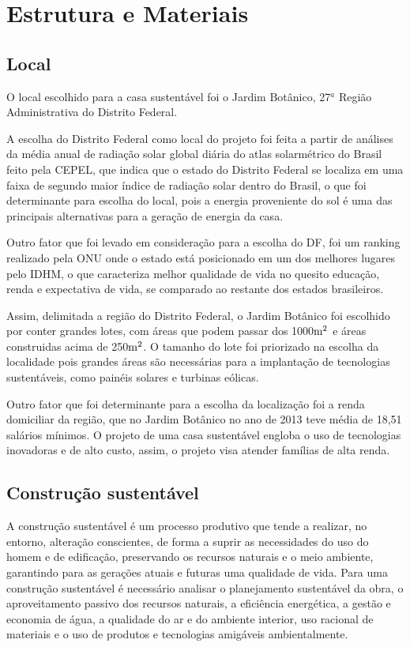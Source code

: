 \chapter{Estrutura e Materiais}

\section{Local}
	O local escolhido para a casa sustentável foi o Jardim Botânico, 27$^a$ Região Administrativa do Distrito Federal.

	A escolha do Distrito Federal como local do projeto foi feita a partir de análises da média anual de radiação solar global diária do atlas solarmétrico do Brasil feito pela CEPEL, que indica que o estado do Distrito Federal se localiza em uma faixa de segundo maior índice de radiação solar dentro do Brasil, o que foi determinante para escolha do local, pois a energia proveniente do sol é uma das principais alternativas para a geração de energia da casa.

	Outro fator que foi levado em consideração para a escolha do DF, foi um ranking realizado pela ONU onde o estado está posicionado em um dos melhores lugares pelo IDHM, o que caracteriza melhor qualidade de vida no quesito educação, renda e expectativa de vida, se comparado ao restante dos estados brasileiros.

	Assim, delimitada a região do Distrito Federal, o Jardim Botânico foi escolhido por conter grandes lotes, com áreas que podem passar dos 1000$\textup{m}^{2}$\cite{5298d86a7fd17} e áreas construidas acima de 250$\textup{m}^{2}$\cite{PDAD}. O tamanho do lote foi priorizado na escolha da localidade pois grandes áreas são necessárias para a implantação de tecnologias sustentáveis, como painéis solares e turbinas eólicas.

	Outro fator que foi determinante para a escolha da localização foi a renda domiciliar da região, que no Jardim Botânico no ano de 2013 teve média de 18,51 salários mínimos\cite{pesquisa_socioeconomica}. O projeto de uma casa sustentável engloba o uso de tecnologias inovadoras e de alto custo, assim, o projeto visa atender famílias de alta renda.

\section{Construção sustentável}

	A construção sustentável é um processo produtivo que tende a realizar, no entorno, alteração conscientes, de forma a suprir as necessidades do uso do homem e de edificação, preservando os recursos naturais e o meio ambiente, garantindo para as gerações atuais e futuras uma qualidade de vida\cite{Baroni1992}. Para uma construção sustentável é necessário analisar o planejamento sustentável da obra, o aproveitamento passivo dos recursos naturais, a eficiência energética, a gestão e economia de água, a qualidade do ar e do ambiente interior, uso racional de materiais e o uso de produtos e tecnologias amigáveis ambientalmente\cite{Araujo2012}.

